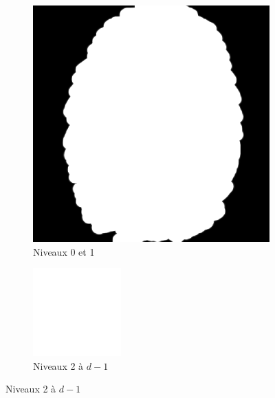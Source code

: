 \begin{figure}
\begin{subfigure}[b]{.25\textwidth}
        \includegraphics[width=\textwidth]{contenu/resources/images/pc_layer_0_1}
        \caption{Niveaux 0 et 1}
    \end{subfigure}
    \hfill
    \begin{subfigure}[b]{.25\textwidth}
        \centering
        \includegraphics[width=\textwidth]{contenu/resources/images/pc_layer_2_depth-1}
        \caption{Niveaux 2 à $d-1$}
    \end{subfigure}


\end{figure}
